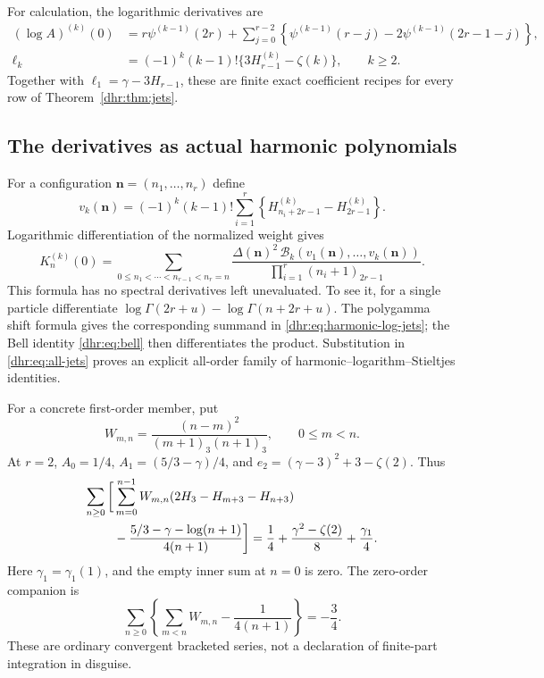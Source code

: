 \documentclass[11pt,letterpaper]{article}
\numberwithin{equation}{section}
\theoremstyle{definition}\newtheorem{definition}[theorem]{Definition}
\theoremstyle{remark}\newtheorem{remark}[theorem]{Remark}
\newcommand{\Bell}{\mathcal B}
\begin{document}
For calculation, the logarithmic derivatives are
\begin{align}
 (\log A)^{(k)}(0)
 &=r\psi^{(k-1)}(2r)
 +\sum_{j=0}^{r-2}\left\{\psi^{(k-1)}(r-j)
                    -2\psi^{(k-1)}(2r-1-j)\right\},
 \label{dhr:eq:integer-A-jets}\\
 \ell_k&=(-1)^k(k-1)!
       \{3H_{r-1}^{(k)}-\zeta(k)\},\qquad k\geq2.
 \label{dhr:eq:integer-E-jets}
\end{align}
Together with $\ell_1=\gamma-3H_{r-1}$, these are finite exact
coefficient recipes for every row of Theorem~\ref{dhr:thm:jets}.

\subsection{The derivatives as actual harmonic polynomials}
For a configuration $\bm n=(n_1,\ldots,n_r)$ define
\begin{equation}\label{dhr:eq:harmonic-log-jets}
 v_k(\bm n)=(-1)^k(k-1)!
  \sum_{i=1}^r\left\{H_{n_i+2r-1}^{(k)}-H_{2r-1}^{(k)}\right\}.
\end{equation}
Logarithmic differentiation of the normalized weight gives
\begin{equation}\label{dhr:eq:K-harmonic}
 K_n^{(k)}(0)=
 \sum_{0\leq n_1<\cdots<n_{r-1}<n_r=n}
 \frac{\Delta(\bm n)^2\,
  \Bell_k(v_1(\bm n),\ldots,v_k(\bm n))}
 {\displaystyle\prod_{i=1}^r(n_i+1)_{2r-1}}.
\end{equation}
This formula has no spectral derivatives left unevaluated. To see it,
for a single particle differentiate
$\log\Gamma(2r+u)-\log\Gamma(n+2r+u)$.
The polygamma shift formula gives the corresponding summand in
\eqref{dhr:eq:harmonic-log-jets}; the Bell identity
\eqref{dhr:eq:bell} then differentiates the product. Substitution in
\eqref{dhr:eq:all-jets} proves an explicit all-order family of
harmonic--logarithm--Stieltjes identities.

For a concrete first-order member, put
\begin{equation}\label{dhr:eq:W2}
 W_{m,n}=\frac{(n-m)^2}{(m+1)_3(n+1)_3},\qquad 0\leq m<n.
\end{equation}
At $r=2$, $A_0=1/4$, $A_1=(5/3-\gamma)/4$, and
$e_2=(\gamma-3)^2+3-\zeta(2)$. Thus
\begin{align}
 \sum_{n\geq0}\bigg[&\sum_{m=0}^{n-1}W_{m,n}
       (2H_3-H_{m+3}-H_{n+3})\notag\\
 &-\frac{5/3-\gamma-\log(n+1)}{4(n+1)}\bigg]
 =\frac14+\frac{\gamma^2-\zeta(2)}8+\frac{\gamma_1}{4}.
 \label{dhr:eq:explicit-stieltjes}
\end{align}
Here $\gamma_1=\gamma_1(1)$, and the empty inner sum at $n=0$ is zero.
The zero-order companion is
\begin{equation}\label{dhr:eq:explicit-stieltjes-zero}
 \sum_{n\geq0}\left\{\sum_{m<n}W_{m,n}-\frac1{4(n+1)}\right\}
 =-\frac34.
\end{equation}
These are ordinary convergent bracketed series, not a declaration of
finite-part integration in disguise.
\end{document}
